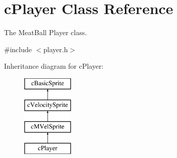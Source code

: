 \hypertarget{classc_player}{\section{c\-Player Class Reference}
\label{classc_player}
}


The Meat\-Ball Player class.  




{\ttfamily \#include $<$player.\-h$>$}

Inheritance diagram for c\-Player\-:\begin{figure}[H]
\begin{center}
\leavevmode
\includegraphics[height=4.000000cm]{classc_player}
\end{center}
\end{figure}
